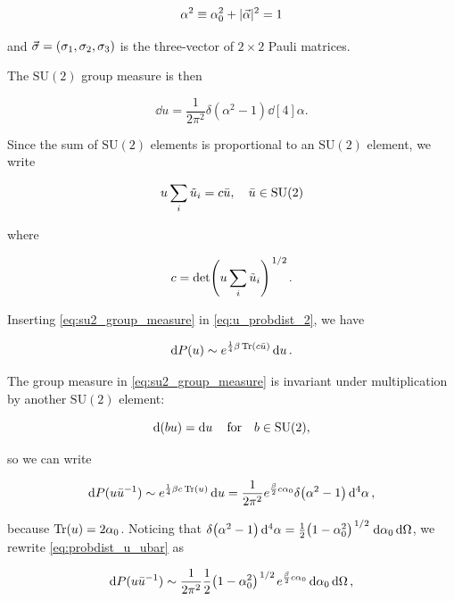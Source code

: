 \documentclass[reqno,12pt]{article}
\numberwithin{equation}{section}
\newcommand{\SU}{\mathrm{SU}}
\begin{document}
\begin{equation}
	\alpha^2 \equiv \alpha_0^2 + |\va{\alpha}|^2 = 1
\end{equation} 

and $\va{\sigma} = \qty(\sigma_1, \sigma_2, \sigma_3)$ is the three-vector of $2 \times 2$ Pauli matrices. 

The $\SU(2)$ group measure is then

\begin{equation} \label{eq:su2_group_measure}
	\dd{u} = \frac{1}{2\pi^2} \delta(\alpha^2 - 1) \dd[4]{\alpha}.
\end{equation}

Since the sum of $\SU(2)$ elements is proportional to an $\SU(2)$ element, we write

\begin{equation}
	u \sum_i \tilde{u}_i = c \bar{u} \qc \bar{u} \in \SU(2)
\end{equation}

where 

\begin{equation}
	c = \det(u \sum_i \tilde{u}_i)^{\flatfrac{1}{2}}.
\end{equation}

Inserting \eqref{eq:su2_group_measure} in \eqref{eq:u_probdist_2}, we have

\begin{equation}
	\dd{P(u)} \sim e^{\frac{1}{4}\beta\Tr(c \bar{u})} \dd{u}.
\end{equation}

The group measure in \eqref{eq:su2_group_measure} is invariant under multiplication by another $\SU(2)$ element:

\begin{equation}
	\dd(b u) = \dd{u} \qfor b \in \SU(2),
\end{equation}

so we can write

\begin{equation} \label{eq:probdist_u_ubar}
	\dd{P(u \bar{u}^{-1})} \sim e^{\frac{1}{4}\beta c \Tr(u)} \dd{u} 
	= \frac{1}{2\pi^2} e^{\frac{\beta}{2}c \alpha_0} \delta\qty(\alpha^2 - 1) \dd[4]{\alpha},
\end{equation}

because $\Tr(u) = 2\alpha_0$. Noticing that $\delta\qty(\alpha^2 - 1)\dd[4]{\alpha} = 
\frac{1}{2}\qty(1 - \alpha_0^2)^{\flatfrac{1}{2}} \dd{\alpha_0}\dd{\Omega}$, we rewrite \eqref{eq:probdist_u_ubar} as

\begin{equation}
	\dd{P(u \bar{u}^{-1})} \sim 
	\frac{1}{2\pi^2} \frac{1}{2}\qty(1 - \alpha_0^2)^{\flatfrac{1}{2}} e^{\frac{\beta}{2}c \alpha_0} \dd{\alpha_0}\dd{\Omega},
\end{equation}
\end{document}
